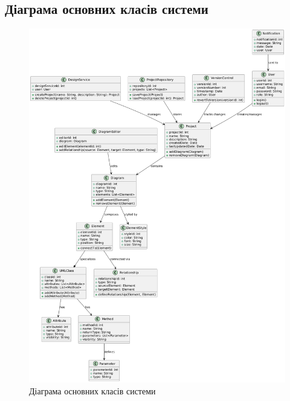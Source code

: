 \documentclass[oneside,14pt]{extarticle}
\begin{document}
\begin{normalsize}
	\subsection{Діаграма основних класів системи}
	\begin{figure}[H]
		\centering
		\includegraphics[width=\columnwidth]{5}
		\caption{Діаграма основних класів системи}
	\end{figure}
	

\end{normalsize}
\end{document}
